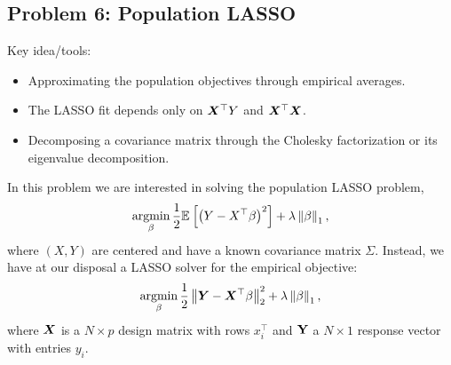 \subsection*{Problem 6: Population LASSO}

Key idea/tools:

\begin{itemize}
  \item Approximating the population objectives through empirical averages.
  \item The LASSO fit depends only on $\bm{X}^\top Y$ and $\bm{X}^\top \bm{X}$.
  \item Decomposing a covariance matrix through the Cholesky factorization or its eigenvalue decomposition. 
\end{itemize}


In this problem we are interested in solving the population LASSO problem,
\begin{equation}
\label{eq:population_lasso}
\operatorname*{argmin}_{\beta} \frac{1}{2} \mathbb{E}_{}\left[\left(Y - X^\top \beta\right)^2\right] + \lambda \left\lVert\beta\right\rVert_1,
\end{equation}
where $(X,Y)$ are centered and have a known covariance matrix $\Sigma$. Instead, we have at our disposal a LASSO solver for the empirical objective:
\begin{equation}
\label{eq:empirical_lasso}
\operatorname*{argmin}_{\beta} \frac{1}{2} \left\lVert\bm{Y} - \bm{X}^\top \beta\right\rVert^2_2 + \lambda \left\lVert\beta\right\rVert_1,
\end{equation}
where $\bm{X}$ is a $N \times p$ design matrix with rows $x_i^\top$ and $\bold{Y}$ a $N\times 1$ response vector with entries $y_i$.


